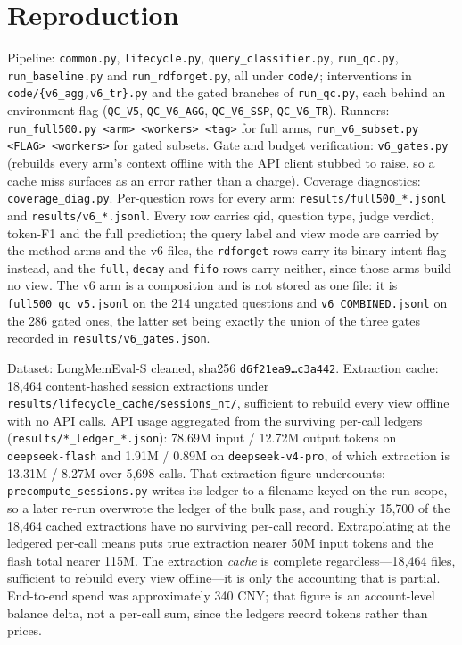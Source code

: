 \documentclass[11pt]{article}
\newcommand{\arm}[1]{\texttt{#1}}
\begin{document}
\appendix
\section{Reproduction}

Pipeline: \texttt{common.py}, \texttt{lifecycle.py}, \texttt{query\_classifier.py}, \texttt{run\_qc.py}, \texttt{run\_baseline.py} and \texttt{run\_rdforget.py}, all under \texttt{code/}; interventions in \texttt{code/\{v6\_agg,v6\_tr\}.py} and the gated branches of \texttt{run\_qc.py}, each behind an environment flag (\texttt{QC\_V5}, \texttt{QC\_V6\_AGG}, \texttt{QC\_V6\_SSP}, \texttt{QC\_V6\_TR}). Runners: \texttt{run\_full500.py <arm> <workers> <tag>} for full arms, \texttt{run\_v6\_subset.py <FLAG> <workers>} for gated subsets. Gate and budget verification: \texttt{v6\_gates.py} (rebuilds every arm's context offline with the API client stubbed to raise, so a cache miss surfaces as an error rather than a charge). Coverage diagnostics: \texttt{coverage\_diag.py}. Per-question rows for every arm: \texttt{results/full500\_*.jsonl} and \texttt{results/v6\_*.jsonl}. Every row carries qid, question type, judge verdict, token-F1 and the full prediction; the query label and view mode are carried by the method arms and the v6 files, the \arm{rdforget} rows carry its binary intent flag instead, and the \arm{full}, \arm{decay} and \arm{fifo} rows carry neither, since those arms build no view. The v6 arm is a composition and is not stored as one file: it is \texttt{full500\_qc\_v5.jsonl} on the 214 ungated questions and \texttt{v6\_COMBINED.jsonl} on the 286 gated ones, the latter set being exactly the union of the three gates recorded in \texttt{results/v6\_gates.json}.

Dataset: LongMemEval-S cleaned, sha256 \texttt{d6f21ea9\ldots c3a442}. Extraction cache: 18{,}464 content-hashed session extractions under \texttt{results/lifecycle\_cache/sessions\_nt/}, sufficient to rebuild every view offline with no API calls. API usage aggregated from the surviving per-call ledgers (\texttt{results/*\_ledger\_*.json}): 78.69M input / 12.72M output tokens on \texttt{deepseek-flash} and 1.91M / 0.89M on \texttt{deepseek-v4-pro}, of which extraction is 13.31M / 8.27M over 5{,}698 calls. That extraction figure undercounts: \texttt{precompute\_sessions.py} writes its ledger to a filename keyed on the run scope, so a later re-run overwrote the ledger of the bulk pass, and roughly 15{,}700 of the 18{,}464 cached extractions have no surviving per-call record. Extrapolating at the ledgered per-call means puts true extraction nearer 50M input tokens and the flash total nearer 115M. The extraction \emph{cache} is complete regardless---18{,}464 files, sufficient to rebuild every view offline---it is only the accounting that is partial. End-to-end spend was approximately 340 CNY; that figure is an account-level balance delta, not a per-call sum, since the ledgers record tokens rather than prices.
\end{document}
